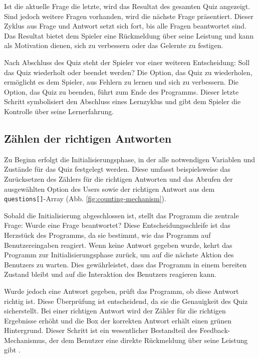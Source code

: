 \documentclass[10pt, fleqn]{scrartcl}
\begin{document}
Ist die aktuelle Frage die letzte, wird das Resultat des gesamten Quiz angezeigt. Sind jedoch weitere Fragen vorhanden, wird die nächste Frage präsentiert. Dieser Zyklus aus Frage und Antwort setzt sich fort, bis alle Fragen beantwortet sind. Das Resultat bietet dem Spieler eine Rückmeldung über seine Leistung und kann als Motivation dienen, sich zu verbessern oder das Gelernte zu festigen.

Nach Abschluss des Quiz steht der Spieler vor einer weiteren Entscheidung: Soll das Quiz wiederholt oder beendet werden? Die Option, das Quiz zu wiederholen, ermöglicht es dem Spieler, aus Fehlern zu lernen und sich zu verbessern. Die Option, das Quiz zu beenden, führt zum Ende des Programms. Dieser letzte Schritt symbolisiert den Abschluss eines Lernzyklus und gibt dem Spieler die Kontrolle über seine Lernerfahrung.

\subsection{Zählen der richtigen Antworten}

Zu Beginn erfolgt die Initialisierungsphase, in der alle notwendigen Variablen und Zustände für das Quiz festgelegt werden. Diese umfasst beispielsweise das Zurücksetzen des Zählers für die richtigen Antworten und das Abrufen der ausgewählten Option des Users sowie der richtigen Antwort aus dem \texttt{questions[]}-Array (Abb. \ref{fig:counting-mechanism}).

Sobald die Initialisierung abgeschlossen ist, stellt das Programm die zentrale Frage: Wurde eine Frage beantwortet? Diese Entscheidungsschleife ist das Herzstück des Programms, da sie bestimmt, wie das Programm auf Benutzereingaben reagiert. Wenn keine Antwort gegeben wurde, kehrt das Programm zur Initialisierungsphase zurück, um auf die nächste Aktion des Benutzers zu warten. Dies gewährleistet, dass das Programm in einem bereiten Zustand bleibt und auf die Interaktion des Benutzers reagieren kann.

Wurde jedoch eine Antwort gegeben, prüft das Programm, ob diese Antwort richtig ist. Diese Überprüfung ist entscheidend, da sie die Genauigkeit des Quiz sicherstellt. Bei einer richtigen Antwort wird der Zähler für die richtigen Ergebnisse erhöht und die Box der korrekten Antwort erhält einen grünen Hintergrund. Dieser Schritt ist ein wesentlicher Bestandteil des Feedback-Mechanismus, der dem Benutzer eine direkte Rückmeldung über seine Leistung gibt \cite{renaud:feedback}.
\end{document}
